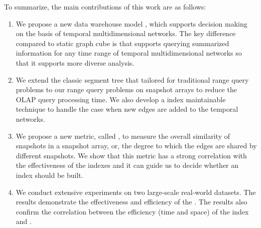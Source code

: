\documentclass[10pt,journal,compsoc]{IEEEtran}
\begin{document}
To summarize, the main contributions of this work are as follows:
\begin{enumerate}
	\item We propose a new data warehouse model   , which supports decision making on the basis of temporal multidimensional networks. The key difference compared to static graph cube is that    supports querying summarized information for any time range of temporal multidimensional networks so that it supports more diverse analysis.
	
	\item We extend the classic segment tree that tailored for traditional range query problems to our range query problems on snapshot arrays to reduce the OLAP query processing time. We also develop a index maintainable technique to handle the case when new edges are added to the temporal networks. %
	
	\item  We propose a new metric, called , to measure the overall similarity of snapshots in a snapshot array, or, the degree to which the edges are shared by different snapshots. We show that this metric has a strong correlation with the effectiveness of the indexes and it can guide us to decide whether an index should be built.

	
	
	\item We conduct extensive experiments on two large-scale real-world datasets. The results demonstrate the effectiveness and efficiency of the . The results also confirm the correlation between the efficiency (time and space) of the index and . %
\end{enumerate}
\end{document}
